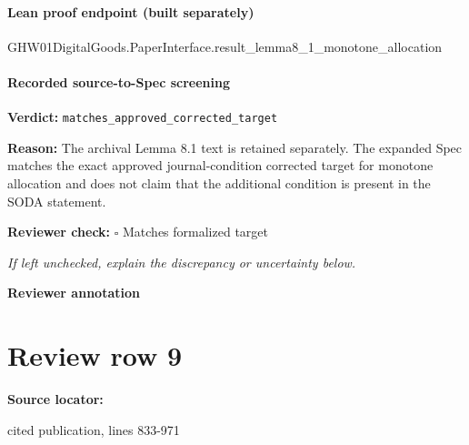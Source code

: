 \documentclass[10pt]{article}
\newcommand{\reviewerbox}{%
  \par\noindent\fbox{\parbox{0.96\linewidth}{\rule{0pt}{0.38in}}}\par
}
\newcommand{\reviewmatch}[1]{%
  \par\noindent\textbf{Reviewer check:} $\square$\; #1\par
  \noindent\emph{If left unchecked, explain the discrepancy or uncertainty below.}\par
}
\begin{document}
\paragraph{Lean proof endpoint (built separately)}\begin{ReviewVerbatim}
GHW01DigitalGoods.PaperInterface.result_lemma8_1_monotone_allocation
\end{ReviewVerbatim}

\paragraph{Recorded source-to-Spec screening}
\textbf{Verdict:} \texttt{matches\_approved\_corrected\_target}
\\
{\raggedright
\textbf{Reason:} The archival Lemma 8.\allowbreak{}1 text is retained separately.\allowbreak{} The expanded Spec matches the exact approved journal-\allowbreak{}condition corrected target for monotone allocation and does not claim that the additional condition is present in the SODA statement.\allowbreak{}
\par}
\reviewmatch{Matches formalized target}
\noindent\textbf{Reviewer annotation}\par
\reviewerbox
\clearpage
\hypertarget{source-claim-e7742b37ea94b834}{}
\section*{Review row 9}
\textbf{Source locator:} {\footnotesize\raggedright cited publication, lines 833-\allowbreak{}971\par}
\end{document}
